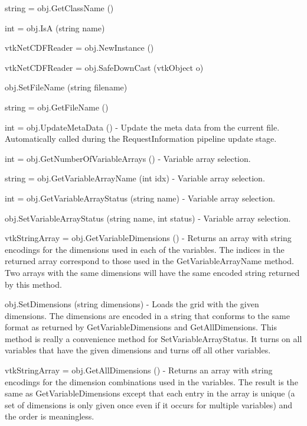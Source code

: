 \begin{DoxyItemize}
\item {\ttfamily string = obj.\-Get\-Class\-Name ()}  
\item {\ttfamily int = obj.\-Is\-A (string name)}  
\item {\ttfamily vtk\-Net\-C\-D\-F\-Reader = obj.\-New\-Instance ()}  
\item {\ttfamily vtk\-Net\-C\-D\-F\-Reader = obj.\-Safe\-Down\-Cast (vtk\-Object o)}  
\item {\ttfamily obj.\-Set\-File\-Name (string filename)}  
\item {\ttfamily string = obj.\-Get\-File\-Name ()}  
\item {\ttfamily int = obj.\-Update\-Meta\-Data ()} -\/ Update the meta data from the current file. Automatically called during the Request\-Information pipeline update stage.  
\item {\ttfamily int = obj.\-Get\-Number\-Of\-Variable\-Arrays ()} -\/ Variable array selection.  
\item {\ttfamily string = obj.\-Get\-Variable\-Array\-Name (int idx)} -\/ Variable array selection.  
\item {\ttfamily int = obj.\-Get\-Variable\-Array\-Status (string name)} -\/ Variable array selection.  
\item {\ttfamily obj.\-Set\-Variable\-Array\-Status (string name, int status)} -\/ Variable array selection.  
\item {\ttfamily vtk\-String\-Array = obj.\-Get\-Variable\-Dimensions ()} -\/ Returns an array with string encodings for the dimensions used in each of the variables. The indices in the returned array correspond to those used in the Get\-Variable\-Array\-Name method. Two arrays with the same dimensions will have the same encoded string returned by this method.  
\item {\ttfamily obj.\-Set\-Dimensions (string dimensions)} -\/ Loads the grid with the given dimensions. The dimensions are encoded in a string that conforms to the same format as returned by Get\-Variable\-Dimensions and Get\-All\-Dimensions. This method is really a convenience method for Set\-Variable\-Array\-Status. It turns on all variables that have the given dimensions and turns off all other variables.  
\item {\ttfamily vtk\-String\-Array = obj.\-Get\-All\-Dimensions ()} -\/ Returns an array with string encodings for the dimension combinations used in the variables. The result is the same as Get\-Variable\-Dimensions except that each entry in the array is unique (a set of dimensions is only given once even if it occurs for multiple variables) and the order is meaningless.  

\end{DoxyItemize}
